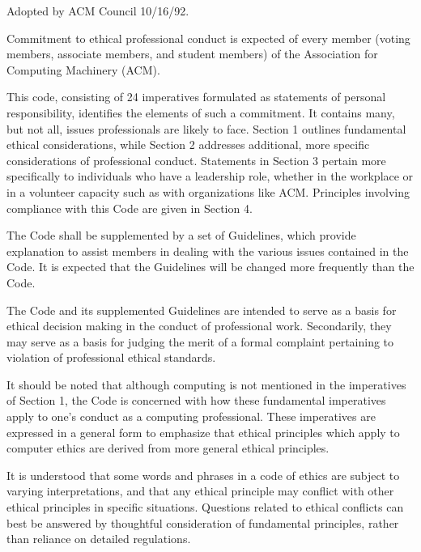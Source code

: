 Adopted by ACM Council 10/16/92.


\vspace{.2in}\vspace{.1in}

Commitment to ethical professional conduct is expected of every member (voting members, associate members, and student members) of the Association for Computing Machinery (ACM).

This code, consisting of 24 imperatives formulated as statements of personal responsibility, identifies the elements of such a commitment. It contains many, but not all, issues professionals are likely to face. Section 1 outlines fundamental ethical considerations, while Section 2 addresses additional, more specific considerations of professional conduct. Statements in Section 3 pertain more specifically to individuals who have a leadership role, whether in the workplace or in a volunteer capacity such as with organizations like ACM. Principles involving compliance with this Code are given in Section 4.

The Code shall be supplemented by a set of Guidelines, which provide explanation to assist members in dealing with the various issues contained in the Code. It is expected that the Guidelines will be changed more frequently than the Code.

The Code and its supplemented Guidelines are intended to serve as a basis for ethical decision making in the conduct of professional work. Secondarily, they may serve as a basis for judging the merit of a formal complaint pertaining to violation of professional ethical standards.

It should be noted that although computing is not mentioned in the imperatives of Section 1, the Code is concerned with how these fundamental imperatives apply to one's conduct as a computing professional. These imperatives are expressed in a general form to emphasize that ethical principles which apply to computer ethics are derived from more general ethical principles.

It is understood that some words and phrases in a code of ethics are subject to varying interpretations, and that any ethical principle may conflict with other ethical principles in specific situations. Questions related to ethical conflicts can best be answered by thoughtful consideration of fundamental principles, rather than reliance on detailed regulations.




\vspace{.2in}\vspace{.1in}

